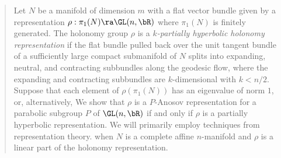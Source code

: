 	\begin{abstract}

Let $N$ be a manifold of dimension $m$ with a flat vector bundle given by 
a representation $\rho:\pi_1(N) \ra \GL(n, \bR)$
where $\pi_1(N)$ is finitely generated. 
The holonomy group 
$\rho$ is a \emph{$k$-partially hyperbolic holonomy representation} if the flat bundle pulled back over the unit tangent bundle of a sufficiently large compact submanifold of $N$ splits into expanding, neutral, and contracting subbundles along the geodesic flow, where the expanding and contracting subbundles are $k$-dimensional with $k < n/2$.
Suppose that each element of $\rho(\pi_1(N))$ has an eigenvalue of norm $1$,
or, alternatively,  
We show that $\rho$ is a $P$-Anosov representation for a parabolic subgroup 
$P$ of $\GL(n, \bR)$ 
if and only if $\rho$ is a partially hyperbolic representation. 
We will primarily employ techniques from representation theory.
 when $N$ is a complete affine $n$-manifold
and $\rho$ is a linear part of the holonomy representation. 

\end{abstract}
